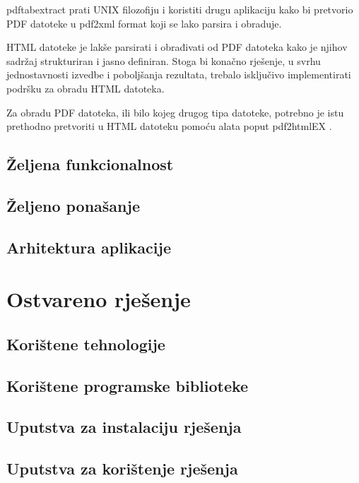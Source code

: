 \documentclass[times, utf8, zavrsni]{fer}
\begin{document}
pdftabextract prati UNIX filozofiju i koristiti drugu aplikaciju kako bi
pretvorio PDF datoteke u pdf2xml format koji se lako parsira i obraduje.

HTML datoteke je lakše parsirati i obrađivati od PDF datoteka kako je njihov
sadržaj strukturiran i jasno definiran.
Stoga bi konačno rješenje, u svrhu
jednostavnosti izvedbe i poboljšanja rezultata, trebalo isključivo
implementirati podršku za obradu HTML datoteka.

Za obradu PDF datoteka, ili bilo kojeg drugog tipa datoteke,
potrebno je istu prethodno pretvoriti u HTML datoteku pomoću alata poput
pdf2htmlEX \cite{pdf2htmlex_repository}.

\section{Željena funkcionalnost}

\section{Željeno ponašanje}

\section{Arhitektura aplikacije}



\chapter{Ostvareno rješenje}

\section{Korištene tehnologije}

\section{Korištene programske biblioteke}

\section{Uputstva za instalaciju rješenja}

\section{Uputstva za korištenje rješenja}
\end{document}
